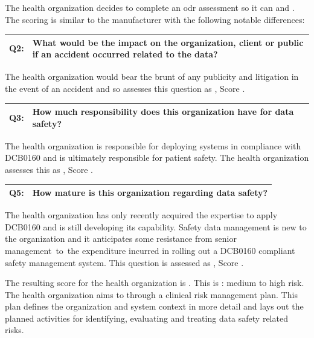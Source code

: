 The health organization decides to complete an \gls{odr} assessment
so it can  and . The scoring is similar to the manufacturer with the following notable differences:

\begin{longtable*}[H]
  {|L{}|L{}|}
  \hline
  Q2: & What would be the impact on the organization, client or public if an accident occurred related to the data?\\
  \hline
\end{longtable*}

The health organization would bear the brunt of any publicity and litigation in the event of an accident and so assesses this question as , Score .

\begin{longtable*}[H]
  {|L{}|L{}|}
  \hline
  Q3: & How much responsibility does this organization have for data safety?\\
  \hline
\end{longtable*}

The health organization is responsible for deploying systems in compliance with
DCB0160 \cite{citation:dcb0160clinical}
and is ultimately responsible for patient safety. The health organization assesses this as , Score .

\begin{longtable*}[H]
  {|L{}|L{}|}
  \hline
  Q5: & How mature is this organization regarding data safety?\\
  \hline
\end{longtable*}

The health organization has only recently acquired the expertise to apply
DCB0160
and is still developing its capability. Safety data management is new to the organization and it anticipates some resistance from senior management\cbstart\ to\cbend\ the expenditure incurred in rolling out a DCB0160 compliant safety management system. This question is assessed as , Score .

The resulting score for the health organization is . This is : medium to high risk.
The health organization aims to  through a clinical risk management plan. This plan defines the organization and system context in more detail and lays out the planned activities for identifying, evaluating and treating data safety related risks.

